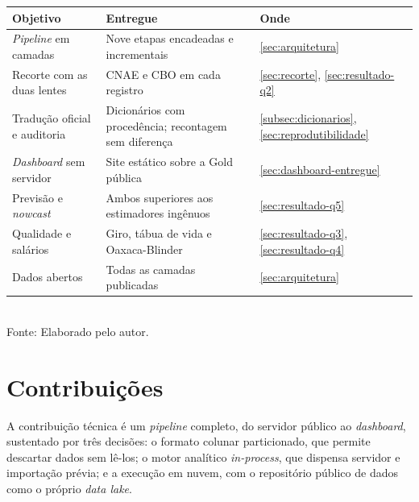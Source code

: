 \begin{quadro}[htbp]
    \centering
    \caption{Objetivos específicos e o que foi entregue}
    \label{quadro:objetivos}
    \footnotesize
    \renewcommand{\arraystretch}{1.25}
    \begin{tabularx}{\textwidth}{%
        >{\raggedright\arraybackslash\hsize=1.00\hsize}X
        >{\raggedright\arraybackslash\hsize=1.30\hsize}X
        >{\raggedright\arraybackslash\hsize=0.70\hsize}X}
        \toprule
        \rowcolor{black!8}
        \textbf{Objetivo} & \textbf{Entregue} & \textbf{Onde} \\
        \midrule
        \textit{Pipeline} em camadas & Nove etapas encadeadas e incrementais & \autoref{sec:arquitetura} \\
        Recorte com as duas lentes & CNAE e CBO em cada registro & \autoref{sec:recorte}, \autoref{sec:resultado-q2} \\
        Tradução oficial e auditoria & Dicionários com procedência; recontagem sem diferença & \autoref{subsec:dicionarios}, \autoref{sec:reprodutibilidade} \\
        \textit{Dashboard} sem servidor & Site estático sobre a Gold pública & \autoref{sec:dashboard-entregue} \\
        Previsão e \textit{nowcast} & Ambos superiores aos estimadores ingênuos & \autoref{sec:resultado-q5} \\
        Qualidade e salários & Giro, tábua de vida e Oaxaca-Blinder & \autoref{sec:resultado-q3}, \autoref{sec:resultado-q4} \\
        Dados abertos & Todas as camadas publicadas & \autoref{sec:arquitetura} \\
        \bottomrule
    \end{tabularx}
    \\[4pt]
    {\footnotesize Fonte: Elaborado pelo autor.}
\end{quadro}

\section{Contribuições}

A contribuição técnica é um \textit{pipeline} completo, do servidor público ao \textit{dashboard}, sustentado por três decisões: o formato colunar particionado, que permite descartar dados sem lê-los; o motor analítico \textit{in-process}, que dispensa servidor e importação prévia; e a execução em nuvem, com o repositório público de dados como o próprio \textit{data lake}.

